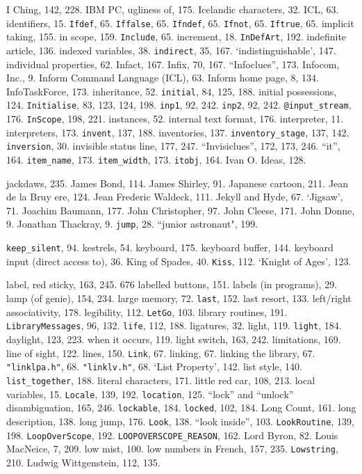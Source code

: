 I Ching, 142, 228.
IBM PC, ugliness of, 175.
Icelandic characters, 32.
ICL, 63.
identifiers, 15.
{{\tt Ifdef}}, 65.
{{\tt Iffalse}}, 65.
{{\tt Ifndef}}, 65.
{{\tt Ifnot}}, 65.
{{\tt Iftrue}}, 65.
implicit taking, 155.
in scope, 159.
{{\tt Include}}, 65.
increment, 18.
{{\tt InDefArt}}, 192.
indefinite article, 136.
indexed variables, 38.
{{\tt indirect}}, 35, 167.
`indistinguishable', 147.
individual properties, 62.
Infact, 167.
Infix, 70, 167.
``Infoclues'', 173.
Infocom, Inc., 9.
Inform Command Language (ICL), 63.
Inform home page, 8, 134.
InfoTaskForce, 173.
inheritance, 52.
{{\tt initial}}, 84, 125, 188.
initial possessions, 124.
{{\tt Initialise}}, 83, 123, 124, 198.
{{\tt inp1}}, 92, 242.
{{\tt inp2}}, 92, 242.
{{\tt @input\_stream}}, 176.
{{\tt InScope}}, 198, 221.
instances, 52.
internal text format, 176.
interpreter, 11.
interpreters, 173.
{{\tt invent}}, 137, 188.
inventories, 137.
{{\tt inventory\_stage}}, 137, 142.
{{\tt inversion}}, 30.
invisible status line, 177, 247.
``Invisiclues'', 172, 173, 246.
``it'', 164.
{{\tt item\_name}}, 173.
{{\tt item\_width}}, 173.
{{\tt itobj}}, 164.
Ivan O. Ideas, 128.

jackdaws, 235.
James Bond, 114.
James Shirley, 91.
Japanese cartoon, 211.
Jean de la Bruy{ e}re, 124.
Jean Frederic Waldeck, 111.
Jekyll and Hyde, 67.
`Jigsaw', 71.
Joachim Baumann, 177.
John Christopher, 97.
John Cleese, 171.
John Donne, 9.
Jonathan Thackray, 9.
{{\tt jump}}, 28.
``junior astronaut", 199.

{{\tt keep\_silent}}, 94.
kestrels, 54.
keyboard, 175.
keyboard buffer, 144.
keyboard input (direct access to), 36.
King of Spades, 40.
{{\tt Kiss}}, 112.
`Knight of Ages', 123.

label, red sticky, 163, 245.
676 labelled buttons, 151.
labels (in programs), 29.
lamp (of genie), 154, 234.
large memory, 72.
{{\tt last}}, 152.
last resort, 133.
left/right associativity, 178.
legibility, 112.
{{\tt LetGo}}, 103.
library routines, 191.
{{\tt LibraryMessages}}, 96, 132.
{{\tt life}}, 112, 188.
ligatures, 32.
light, 119.
{{\tt light}}, 184.
\quad  daylight, 123, 223.
\quad  when it occurs, 119.
light switch, 163, 242.
limitations, 169.
line of sight, 122.
lines, 150.
{{\tt Link}}, 67.
linking, 67.
linking the library, 67.
{{\tt "linklpa.h"}}, 68.
{{\tt "linklv.h"}}, 68.
`List Property', 142.
list style, 140.
{{\tt list\_together}}, 188.
literal characters, 171.
little red car, 108, 213.
local variables, 15.
{{\tt Locale}}, 139, 192.
{{\tt location}}, 125.
``lock'' and ``unlock'' disambiguation, 165, 246.
{{\tt lockable}}, 184.
{{\tt locked}}, 102, 184.
Long Count, 161.
long description, 138.
long jump, 176.
{{\tt Look}}, 138.
``look inside'', 103.
{{\tt LookRoutine}}, 139, 198.
{{\tt LoopOverScope}}, 192.
{{\tt LOOPOVERSCOPE\_REASON}}, 162.
Lord Byron, 82.
Louis MacNeice, 7, 209.
low mist, 100.
low numbers in French, 157, 235.
{{\tt Lowstring}}, 210.
Ludwig Wittgenstein, 112, 135.

